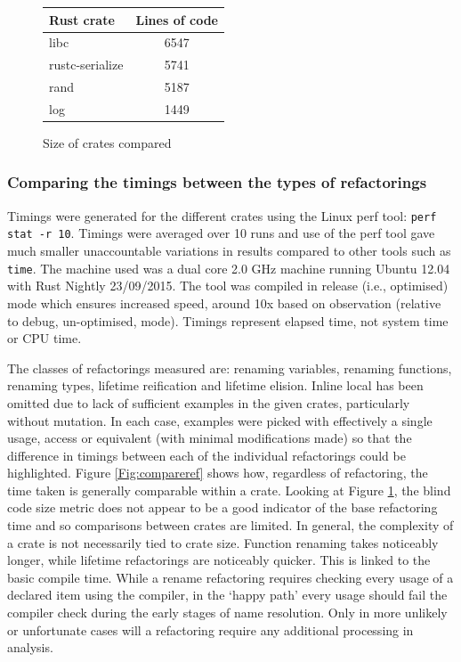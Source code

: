 \begin{figure}[h]
\begin{center}
    \begin{tabular}{ | l | c |}
    \hline
    \textbf{Rust crate} & \textbf{Lines of code} \\ \hline
    libc & 6547 \\ \hline
    rustc-serialize &  5741 \\ \hline
    rand &   5187 \\ \hline
    log &  1449 \\ \hline
    \end{tabular}
\end{center}

\caption{Size of crates compared}
\label{Fig:codesize}
\end{figure}

\subsubsection{Comparing the timings between the types of refactorings}
Timings were generated for the different crates using the Linux perf tool: {\verb|perf stat -r 10|}. Timings were averaged over 10 runs and use of the perf tool gave much smaller unaccountable variations in results compared to other tools such as {\verb|time|}. The machine used was a dual core 2.0 GHz machine running Ubuntu 12.04 with Rust Nightly 23/09/2015. The tool was compiled in release (i.e., optimised) mode which ensures increased speed, around 10x based on observation (relative to debug, un-optimised, mode). Timings represent elapsed time, not system time or CPU time.

The classes of refactorings measured are: renaming variables, renaming functions, renaming types, lifetime reification and lifetime elision. Inline local has been omitted due to lack of sufficient examples in the given crates, particularly without mutation. In each case, examples were picked with effectively a single usage, access or equivalent (with minimal modifications made) so that the difference in timings between each of the individual refactorings could be highlighted. Figure \ref{Fig:compareref} shows how, regardless of refactoring, the time taken is generally comparable within a crate. Looking at Figure \ref{Fig:codesize}, the blind code size metric does not appear to be a good indicator of the base refactoring time and so comparisons between crates are limited. In general, the complexity of a crate is not necessarily tied to crate size. Function renaming takes noticeably longer, while lifetime refactorings are noticeably quicker. This is linked to the basic compile time. While a rename refactoring requires checking every usage of a declared item using the compiler, in the `happy path' every usage should fail the compiler check during the early stages of name resolution. Only in more unlikely or unfortunate cases will a refactoring require any additional processing in analysis.

